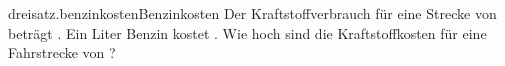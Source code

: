 \begin{exercise}{dreisatz.benzinkosten}{Benzinkosten}
  \ifproblem\problem
    Der Kraftstoffverbrauch für eine Strecke von  beträgt .
    Ein Liter Benzin kostet . Wie hoch sind die Kraftstoffkosten für
    eine Fahrstrecke von ?
  \fi
\end{exercise}
